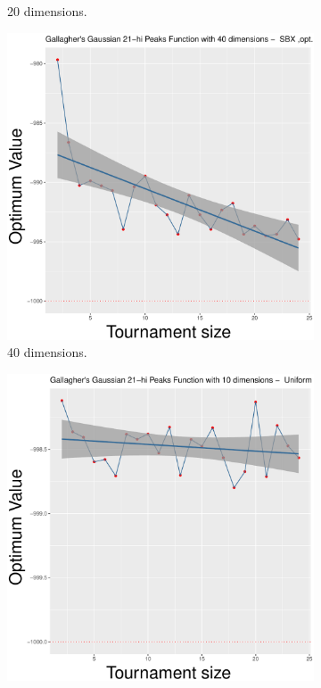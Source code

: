 \begin{figure}[t]
\begin{subfigure}[b]{0.33\textwidth}
		\caption{20 dimensions.}
	\end{subfigure}
	\begin{subfigure}[b]{0.33\textwidth}
		\centering
		\includegraphics[width=\textwidth]{img/SBX-40D/multimodal_sbx_22_dim_40.pdf}
		\caption{40 dimensions.}
	\end{subfigure}
	\caption{Average performance on different tournament size for the Gallagher's Gaussian 21-hi Peaks Function, when using the SBX crossover - ($\lambda, \lambda$) scheme.}
	\label{sbx-22-a}
	\begin{subfigure}[b]{0.33\textwidth}
		\centering
		\includegraphics[width=\textwidth]{img/uniform-10D/multimodal_uniform_22_dim_10.pdf}

\end{subfigure}
\end{figure}

